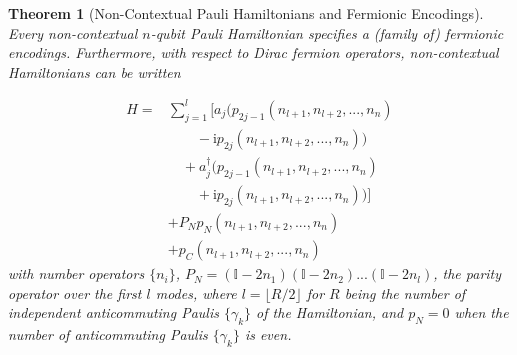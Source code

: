 \documentclass[%
 aip,
 amsmath,amssymb,
 reprint,%
]{revtex4-1}
\newtheorem{theorem}{Theorem}
\newcommand{\Id}{\mathbb{I}}       %
\newcommand{\kLinIndepAnti}{R}           %
\begin{document}
\begin{theorem}[Non-Contextual Pauli Hamiltonians and Fermionic Encodings]
    Every non-contextual $n$-qubit Pauli Hamiltonian specifies a (family of) fermionic encodings. Furthermore, with respect to Dirac fermion operators, non-contextual Hamiltonians can be written 
     
\begin{equation}
\begin{split}
H = {} & \sum_{{j=1}}^{l} \Big[ a_{{j}} {\big(p_{{2j-1}}{(n_{l+1}, n_{l+2}, ..., n_n)}} \\
& \qquad {{} - \mathrm{i}p_{{2j}}{(n_{l+1}, n_{l+2}, ..., n_n)}\big)} \\
& \quad + a_{{j}}^{\dagger} {\big(p_{{2j-1}}{(n_{l+1}, n_{l+2}, ..., n_n)}} \\
& \qquad {{} + \mathrm{i}p_{{2j}}{(n_{l+1}, n_{l+2}, ..., n_n)}\big)} \Big] \\
& + {P_N p_N}{(n_{l+1}, n_{l+2}, ..., n_n)} \\
& + p_C{(n_{l+1}, n_{l+2}, ..., n_n)}
\end{split}
\label{eq:dependent-fermionic-noncontextual-hamiltonian}
\end{equation}
    with number operators $\{n_i\}$, ${P_N} = {(\Id - 2n_{1}) (\Id - 2n_{2})...(\Id - 2n_{{l}})}$, the parity operator over {the first $l$} modes{, where $l = \lfloor %
    \kLinIndepAnti/2 \rfloor$ for $\kLinIndepAnti$ being the number of independent anticommuting Paulis $\{\gamma_k\}$ of the Hamiltonian, and $p_N = 0$ when the number of anticommuting Paulis $\{\gamma_k\}$ is even}. 
\end{theorem}
\end{document}
